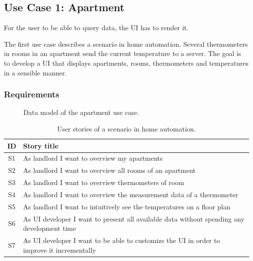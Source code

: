 \subsection{Use Case 1: Apartment}\label{sec:usecase1}
For the user to be able to query data, the UI has to render it.

The first use case describes a scenario in home automation. Several thermometers in rooms in an apartment send the current temperature to a server. The goal is to develop a UI that displays apartments, rooms, thermometers and temperatures in a sensible manner.

\subsubsection{Requirements}

\begin{figure}[!htb]
  \caption{Data model of the apartment use case.}
\end{figure}

\begin{table}
  \begin{center}
    \begin{tabular}{ |c|l| }
      \hline
      \textbf{ID} & \textbf{Story title} \\
      \hline
      S1 & As landlord I want to overview my apartments \\
      \hline
      S2 & As landlord I want to overview all rooms of an apartment \\
      \hline
      S3 & As landlord I want to overview thermometers of room \\
      \hline
      S4 & As landlord I want to overview the measurement data of a thermometer \\
      \hline
      S5 & As landlord I want to intuitively see the temperatures on a floor plan \\
      \hline
      S6 & As UI developer I want to present all available data without spending any development time \\
      \hline
      S7 & As UI developer I want to be able to customize the UI in order to improve it incrementally \\
      \hline
    \end{tabular}
    \caption{User stories of a scenario in home automation.}
    \label{tab:usecase1}
  \end{center}
\end{table}

